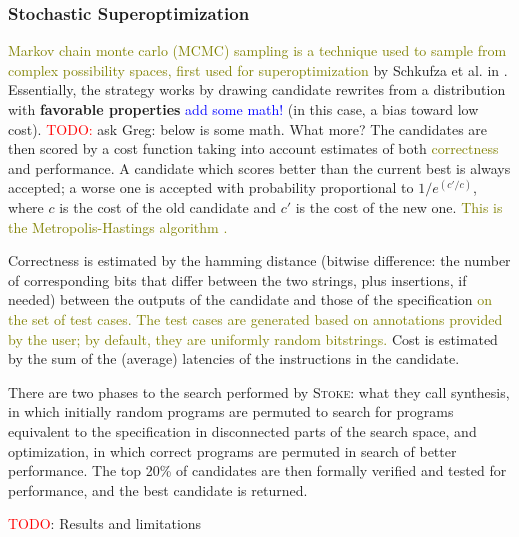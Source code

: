 \documentclass[12pt,twoside]{reedthesis}
\newcommand{\red}[1]{\textcolor{red}{#1}}
\newcommand{\green}[1]{\textcolor{olive}{#1}}
\newcommand{\comment}[2]{\textbf{#1} \textcolor{blue}{#2}}
\newcommand{\addressed}[2]{{#1}}
\begin{document}
\subsubsection{Stochastic Superoptimization}
\green{Markov chain monte carlo (MCMC) sampling is a technique used to sample from complex possibility spaces, first used for superoptimization} by Schkufza et al. in \cite{schkufza2013stoke}.
Essentially, the strategy works by drawing candidate rewrites from a distribution with 
    \comment{favorable properties}{add some math!} (in this case, a bias toward low cost).
\red{TODO:} ask Greg: below is some math. What more?
The candidates are then scored by a cost function taking into account estimates of both \green{correctness} and performance.
A candidate which scores better than the current best is always accepted; a worse one is accepted with probability proportional to $1/e^{(c'/c)}$, where $c$ is the cost of the old candidate and $c'$ is the cost of the new one. 
\green{This is the Metropolis-Hastings algorithm \cite{metropolis1953montecarlo} \cite{hastings1970mcmc}.}
    
Correctness is estimated by the hamming distance (bitwise difference: the number of corresponding bits that differ between the two strings, plus insertions, if needed) between the outputs of the candidate and those of the specification 
\green{on the set of test cases.
The test cases are generated based on annotations provided by the user; by default, they are uniformly random bitstrings.
} %
Cost is estimated by the sum of the (average) latencies of the instructions in the candidate.
    
There are two phases to the search performed by \textsc{Stoke}:
    what they call synthesis, in which initially random programs are permuted to search for programs equivalent to the specification in disconnected parts of the search space,
    and optimization, in which correct programs are permuted in search of better performance.
The top 20\% of candidates are then formally verified and tested for performance, and the best candidate is returned.
    
\red{TODO}: Results and limitations
\end{document}
